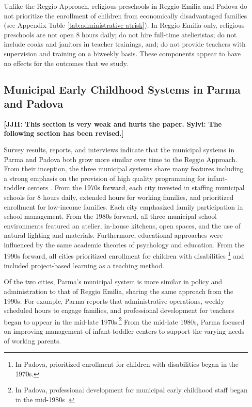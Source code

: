 Unlike the Reggio Approach, religious preschools in Reggio Emilia and Padova do not prioritize the enrollment of children from economically disadvantaged families (see Appendix Table \ref{tab:administrative-atrisk}).  In Reggio Emilia only, religious preschools are not open 8 hours daily; do not hire full-time atelieristas; do not include cooks and janitors in teacher trainings, and; do not provide teachers with supervision and training on a biweekly basis. These components appear to have no effects for the outcomes that we study.

\subsection{Municipal Early Childhood Systems in Parma and Padova}

\textbf{[JJH: This section is very weak and hurts the paper. Sylvi: The following section has been revised.]}

Survey results, reports, and interviews indicate that the municipal systems in Parma and Padova both grow more similar over time to the Reggio Approach. From their inception, the three municipal systems share many features including a strong emphasis on the provision of high quality programming for infant-toddler centers \citep{Ghedini_2001_Ital-Natl-Policy}. From the 1970s forward, each city invested in staffing municipal schools for 8 hours daily, extended hours for working families, and prioritized enrollment for low-income families. Each city emphasized family participation in school management. From the 1980s forward, all three municipal school environments featured an atelier, in-house kitchens, open spaces, and the use of natural lighting and materials. Furthermore, educational approaches were influenced by the same academic theories of psychology and education. From the 1990s forward, all cities prioritized enrollment for children with disabilities \footnote{In Padova, prioritized enrollment for children with disabilities began in the 1970s.} and included project-based learning as a teaching method.

Of the two cities, Parma's municipal system is more similar in policy and administration to that of Reggio Emilia, sharing the same approach from the 1990s. For example, Parma reports that administrative operations, weekly scheduled hours to engage families, and professional development for teachers began to appear in the mid-late 1970s.\footnote{In Padova, professional development for municipal early childhood staff began in the mid-1980s \citep{Becchi-Ferrari_1990_Pub-Inf-Centres-Italy}.} From the mid-late 1980s, Parma focused on improving management of infant-toddler centers to support the varying needs of working parents. 

